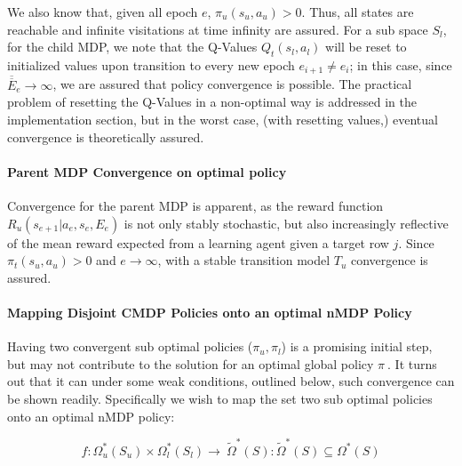 \documentclass[compsoc,journal,letterpaper,10pt,draftclsnofoot,onecolumn]{IEEEtran}
\begin{document}
We also know that, given all epoch \(e\),
\(\pi_{u}\left( s_{u},a_{u} \right) > 0\). Thus, all states are
reachable and infinite visitations at time infinity are assured. For a
sub space \(S_{l}\), for the child MDP, we note that the Q-Values
\(Q_{t}(s_{l},a_{l})\) will be reset to initialized values upon
transition to every new epoch \(e_{i + 1} \neq e_{i}\); in this case,
since \(\overline{\overline E}_{e} \rightarrow \infty\), we are assured that
policy convergence is possible. The practical problem of resetting the
Q-Values in a non-optimal way is addressed in the implementation
section, but in the worst case, (with resetting values,) eventual
convergence is theoretically assured.

\paragraph{Parent MDP Convergence on optimal
policy}\label{parent-mdp-convergence-on-optimal-policy}

Convergence for the parent MDP is apparent, as the reward function
\(R_{u}\left( s_{e + 1}|a_{e},s_{e},E_{e} \right)\) is not only stably
stochastic, but also increasingly reflective of the mean reward expected
from a learning agent given a target row \(j\). Since
\(\pi_{t}\left( s_{u},a_{u} \right) > 0\) and \(e \rightarrow \infty\),
with a stable transition model \(T_{u}\) convergence is assured.

\paragraph{Mapping Disjoint CMDP Policies onto an optimal nMDP
Policy}\label{mapping-disjoint-cmdp-policies-onto-an-optimal-nmdp-policy}

Having two convergent sub optimal policies (\(\pi_{u},\pi_{l}\)) is a
promising initial step, but may not contribute to the solution for an
optimal global policy \(\pi_{\ }.\) It turns out that it can under some
weak conditions, outlined below, such convergence can be shown readily.
Specifically we wish to map the set two sub optimal policies onto an
optimal nMDP policy:

\begin{equation}
f:\Omega_{u}^{*}\left( S_{u} \right) \times \Omega_{l}^{*}\left( S_{l} \right) \rightarrow \ {\tilde{\Omega}}^{*}\left( S \right):{\tilde{\Omega}}^{*}\left( S \right) \subseteq \Omega^{*}\left( S \right)
\end{equation}
 
\end{document}
